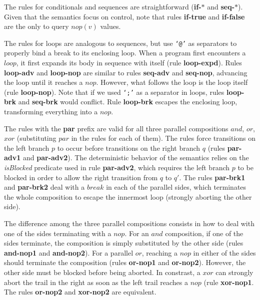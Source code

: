 \documentclass{acm_proc_article-sp}
\newcommand{\code}[1] {{\small{\texttt{#1}}}}
\newcommand{\1}{\;}
\newcommand{\2}{\;\;}
\newcommand{\3}{\;\;\;}
\newcommand{\5}{\;\;\;\;\;}
\begin{document}
The rules for conditionals and sequences are straightforward (\textbf{if-$*$} 
and \textbf{seq-$*$}).
%
Given that the semantics focus on control, note that rules \textbf{if-true} and 
\textbf{if-false} are the only to query $nop(v)$ values.

The rules for loops are analogous to sequences, but use \code{`@'} as 
separators to properly bind a break to its enclosing loop.
%
When a program first encounters a $loop$, it first expands its body in sequence 
with itself (rule \textbf{loop-expd}).
Rules \textbf{loop-adv} and \textbf{loop-nop} are similar to rules 
\textbf{seq-adv} and \textbf{seq-nop}, advancing the loop until it reaches a 
$nop$.
However, what follows the loop is the loop itself (rule \textbf{loop-nop}).
Note that if we used \code{`;'} as a separator in loops, rules 
\textbf{loop-brk} and \textbf{seq-brk} would conflict.
%
Rule \textbf{loop-brk} escapes the enclosing loop, transforming everything into 
a $nop$.

The rules with the \textbf{par} prefix are valid for all three parallel 
compositions $and$, $or$, $xor$ (substituting $par$ in the rules for each of 
them).
The rules force transitions on the left branch $p$ to occur before transitions 
on the right branch $q$ (rules \textbf{par-adv1} and \textbf{par-adv2}).
%
The deterministic behavior of the semantics relies on the \emph{isBlocked} 
predicate used in rule \textbf{par-adv2}, which requires the left branch $p$ to 
be blocked in order to allow the right transition from $q$ to $q'$.
%
The rules \textbf{par-brk1} and \textbf{par-brk2} deal with a $break$ in each 
of the parallel sides, which terminates the whole composition to escape the 
innermost loop (strongly aborting the other side).

The difference among the three parallel compositions consists in how to deal 
with one of the sides terminating with a $nop$.
%
For an $and$ composition, if one of the sides terminate, the composition is 
simply substituted by the other side (rules \textbf{and-nop1} and \textbf{and-nop2}).
%
For a parallel $or$, reaching a $nop$ in either of the sides should terminate 
the composition (rules \textbf{or-nop1} and \textbf{or-nop2}).
However, the other side must be blocked before being aborted.
%
In constrast, a $xor$ can strongly abort the trail in the right as soon as the 
left trail reaches a $nop$ (rule \textbf{xor-nop1}.
The rules \textbf{or-nop2} and \textbf{xor-nop2} are equivalent.
\end{document}
